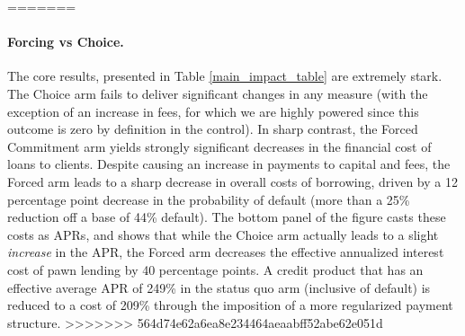 \documentclass[oneside,11pt]{article}
\begin{document}


=======
\paragraph{Forcing vs Choice.} The core results, presented in Table \ref{main_impact_table} are extremely stark.  The Choice arm fails to deliver significant changes in any measure (with the exception of an increase in fees, for which we are highly powered since this outcome is zero by definition in the control).  In sharp contrast, the Forced Commitment arm yields strongly significant decreases in the financial cost of loans to clients.  Despite causing an increase in payments to capital and fees, the Forced arm leads to a sharp decrease in overall costs of borrowing, driven by a 12 percentage point decrease in the probability of default (more than a 25\% reduction off a base of 44\% default).  The bottom panel of the figure casts these costs as APRs, and shows that while the Choice arm actually leads to a slight \textit{increase} in the APR, the Forced arm decreases the effective annualized interest cost of pawn lending by 40 percentage points.  A credit product that has an effective average APR of 249\% in the status quo arm (inclusive of default) is reduced to a cost of 209\% through the imposition of a more regularized payment structure.  
>>>>>>> 564d74e62a6ea8e234464aeaabff52abe62e051d
\end{document}
